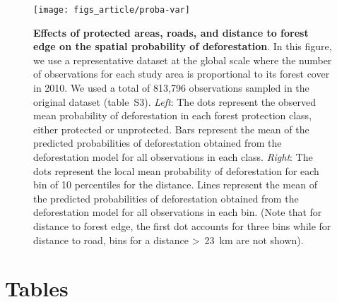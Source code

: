 \documentclass[
  12pt,
]{article}
\begin{document}
\begin{figure}[H]

{\centering \texttt{[image: figs\_article/proba-var]} 

}

\caption{\textbf{Effects of protected areas, roads, and distance to forest edge on the spatial probability of deforestation}. In this figure, we use a representative dataset at the global scale where the number of observations for each study area is proportional to its forest cover in 2010. We used a total of 813,796 observations sampled in the original dataset (table~S3). \emph{Left}: The dots represent the observed mean probability of deforestation in each forest protection class, either protected or unprotected. Bars represent the mean of the predicted probabilities of deforestation obtained from the deforestation model for all observations in each class. \emph{Right}: The dots represent the local mean probability of deforestation for each bin of 10 percentiles for the distance. Lines represent the mean of the predicted probabilities of deforestation obtained from the deforestation model for all observations in each bin. (Note that for distance to forest edge, the first dot accounts for three bins while for distance to road, bins for a distance \textgreater~23~km are not shown).}\label{fig:proba-var}
\end{figure}

\newpage

\hypertarget{tables}{%
\section*{Tables}\label{tables}}
\end{document}
